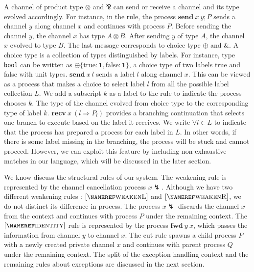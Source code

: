 \documentclass[12pt, openany]{memoir}
\newcommand*{\pare}[0]{\mathbin{\bindnasrepma}}
\newcommand*{\send}[2]{\textbf{send}\ #1\ #2}
\newcommand*{\recv}[2]{\textbf{recv}\ #1\ #2}
\newcommand*{\fwd}[2]{\textbf{fwd}\ #1\ #2}
\newcommand*{\cancel}[1]{#1 \lightning}
\begin{document}
A channel of product type $\otimes$ and $\pare$ can send or receive a channel and its type evolved accordingly. 
For instance, in the  rule, the process $\send{x}{y}; P$ sends a channel $y$ along channel $x$ and continues with process $P$.
Before sending the channel $y$, the channel $x$ has type $A \otimes B$. After sending $y$ of type $A$, the channel $x$ evolved to type $B$.
The last message corresponds to choice type $\oplus$ and $\&$. A choice type is a collection of types distinguished by labels.
For instance, type \texttt{bool} can be written as $\oplus\{\text{true} : \textbf{1}, \text{false} : \textbf{1}\}$,
a choice type of two labels true and false with unit types. $\send{x}{l}$ sends a label $l$ along channel $x$.
This can be viewed as a process that makes a choice to select label $l$ from all the possible label collection $L$.
We add a subscript $k$ as a label to the  rule to indicate the process chooses $k$. The type of the channel evolved from
choice type to the corresponding type of label $k$.
$\recv{x}{(l \Rightarrow P_l)}$ provides a branching continuation that selects one branch to execute based on the label it receives.
We write $\forall l \in L$ to indicate that the process has prepared a process for each label in $L$.
In other words, if there is some label missing in the branching, the process will be stuck and cannot proceed.
However, we can exploit this feature by including non-exhaustive matches in our language, which will be discussed in the later section.

We know discuss the structural rules of our system. The weakening rule is represented by the channel cancellation process $\cancel{x}$.
Although we have two different weakening rules : $\ruleref{weakenL}$ and $\ruleref{weakenR}$, we do not distinct its difference in process.
The process $\cancel{x}$ discards the channel $x$ from the context and continues with process $P$ under the remaining context.
The $\ruleref{identity}$ rule is represented by the process $\fwd{y}{x}$, which passes the information from channel $y$ to channel $x$.
The cut rule spawns a child process $P$ with a newly created private channel $x$ and continues with parent process $Q$ under the remaining context.
The split of the exception handling context and the remaining rules about exceptions are discussed in the next section.
\end{document}
